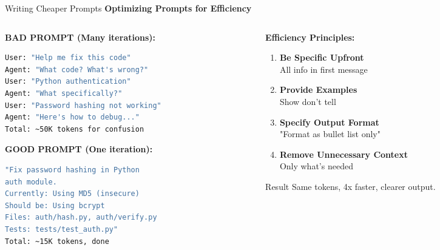 \documentclass[aspectratio=169,11pt]{beamer}
\begin{document}
\begin{frame}[fragile]{Writing Cheaper Prompts}
    \textbf{Optimizing Prompts for Efficiency}

    \begin{columns}[T]
        \begin{column}{0.48\textwidth}
            \textbf{BAD PROMPT (Many iterations):}
            \begin{lstlisting}[language=Bash]
User: "Help me fix this code"
Agent: "What code? What's wrong?"
User: "Python authentication"
Agent: "What specifically?"
User: "Password hashing not working"
Agent: "Here's how to debug..."
Total: ~50K tokens for confusion
            \end{lstlisting}

            \textbf{GOOD PROMPT (One iteration):}
            \begin{lstlisting}[language=Bash]
"Fix password hashing in Python
auth module.
Currently: Using MD5 (insecure)
Should be: Using bcrypt
Files: auth/hash.py, auth/verify.py
Tests: tests/test_auth.py"
Total: ~15K tokens, done
            \end{lstlisting}
        \end{column}
        \begin{column}{0.48\textwidth}
            \textbf{Efficiency Principles:}

            \begin{enumerate}
                \item \textbf{Be Specific Upfront}\\
                All info in first message

                \item \textbf{Provide Examples}\\
                Show don't tell

                \item \textbf{Specify Output Format}\\
                "Format as bullet list only"

                \item \textbf{Remove Unnecessary Context}\\
                Only what's needed
            \end{enumerate}

            \vspace{0.3cm}
            \begin{block}{Result}
                Same tokens, 4x faster, clearer output.
            \end{block}
        \end{column}
    \end{columns}
\end{frame}
\end{document}
